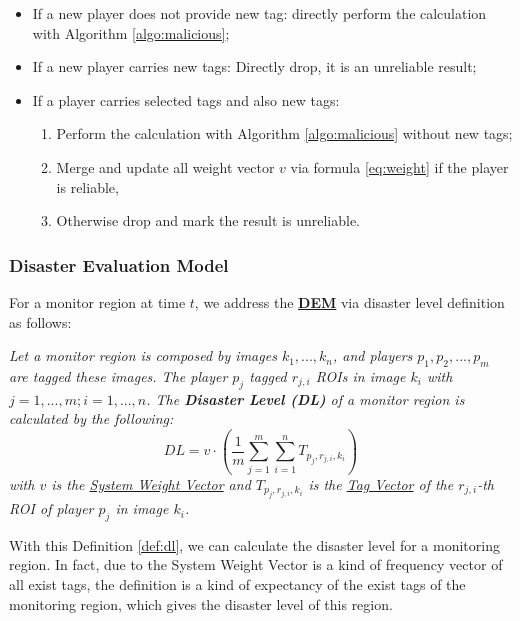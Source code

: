 \begin{itemize}
\item If a new player does not provide new tag: directly perform the calculation with Algorithm \ref{algo:malicious};
\item If a new player carries new tags: Directly drop, it is an unreliable result;
\item If a player carries selected tags and also new tags: 
  \begin{enumerate}
    \item Perform the calculation with Algorithm \ref{algo:malicious} without new tags;
    \item Merge and update all weight vector $v$ via formula \ref{eq:weight} if the player is reliable, 
    \item Otherwise drop and mark the result is unreliable.
  \end{enumerate}
\end{itemize}

\subsubsection{Disaster Evaluation Model}
\label{chapter:dem}

For a monitor region at time $t$, we address the \textbf{\hyperref[idx:dem]{DEM}} 
via disaster level definition as follows:

\begin{definition}
\label{def:dl}
\emph{
Let a monitor region is composed by images $k_1, ..., k_n$, and players $p_1, p_2, ..., p_m$
are tagged these images. The player $p_j$ tagged $r_{j,i}$ ROIs in image $k_i$ with $j=1, ..., m; i=1, ..., n$.
The \textbf{Disaster Level (DL)} of a monitor region is calculated by the following:
\begin{equation}
DL = v \cdot 
  \left(
    \frac{1}{m}
    \sum_{j=1}^{m}{
      \sum_{i=1}^{n}{
          T_{ p_{j}, r_{j,i}, k_{i} }
      }
    }
  \right)
\end{equation}
with $v$ is the \hyperref[def:weightv]{System Weight Vector} and 
$ T_{ p_{j}, r_{j,i}, k_{i} } $ is the \hyperref[def:tagv]{Tag Vector} of the $r_{j,i}$-th ROI of player $p_j$ in image $k_i$.
}
\end{definition}

With this Definition \ref{def:dl}, we can calculate the disaster level for a monitoring region.
In fact, due to the System Weight Vector is a kind of frequency vector of all exist tags, the definition
is a kind of expectancy of the exist tags of the monitoring region, which gives the disaster level of this region.

